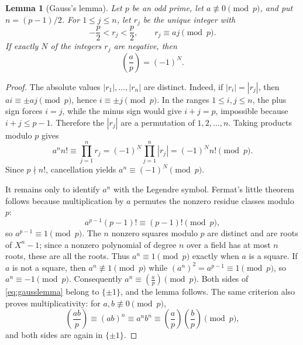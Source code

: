 \documentclass[11pt,a4paper]{amsart}
\numberwithin{equation}{section}
\newtheorem{lemma}[theorem]{Lemma}
\theoremstyle{definition}
\begin{document}
\begin{lemma}[Gauss's lemma]\label{lem:gauss}
Let $p$ be an odd prime, let $a\not\equiv0\pmod p$, and put
$n=(p-1)/2$.  For $1\le j\le n$, let $r_j$ be the unique integer with
\begin{equation*}
 -\frac p2<r_j<\frac p2,
 \qquad r_j\equiv aj\pmod p.
\end{equation*}
If exactly $N$ of the integers $r_j$ are negative, then
\begin{equation}
 \left(\frac ap\right)=(-1)^N.
 \label{eq:gausslemma}
\end{equation}
\end{lemma}

\begin{proof}
The absolute values $|r_1|,\ldots,|r_n|$ are distinct.  Indeed, if
$|r_i|=|r_j|$, then $ai\equiv\pm aj\pmod p$, hence
$i\equiv\pm j\pmod p$.  In the ranges $1\le i,j\le n$, the plus sign
forces $i=j$, while the minus sign would give $i+j=p$, impossible
because $i+j\le p-1$.  Therefore the $|r_j|$ are a permutation of
$1,2,\ldots,n$.  Taking products modulo $p$ gives
\begin{equation*}
 a^n n!
 \equiv\prod_{j=1}^n r_j
 =(-1)^N\prod_{j=1}^n|r_j|
 =(-1)^N n!\pmod p.
\end{equation*}
Since $p\nmid n!$, cancellation yields
$a^n\equiv(-1)^N\pmod p$.

It remains only to identify $a^n$ with the Legendre symbol.  Fermat's
little theorem follows because multiplication by $a$ permutes the
nonzero residue classes modulo $p$:
\begin{equation*}
 a^{p-1}(p-1)!\equiv(p-1)!\pmod p,
\end{equation*}
so $a^{p-1}\equiv1\pmod p$.  The $n$ nonzero squares modulo $p$ are
distinct and are roots of $X^n-1$; since a nonzero polynomial of
degree $n$ over a field has at most $n$ roots, these are all the roots.
Thus $a^n\equiv1\pmod p$ exactly when $a$ is a square.  If $a$ is not
a square, then $a^n\not\equiv1\pmod p$ while
$(a^n)^2=a^{p-1}\equiv1\pmod p$, so $a^n\equiv-1\pmod p$.
Consequently $a^n\equiv\left(\frac ap\right)\pmod p$.  Both sides of
\eqref{eq:gausslemma} belong to $\{\pm1\}$, and the lemma follows.
The same criterion also proves multiplicativity: for
$a,b\not\equiv0\pmod p$,
\begin{equation*}
 \left(\frac{ab}{p}\right)
 \equiv (ab)^n
 \equiv a^n b^n
 \equiv \left(\frac ap\right)\left(\frac bp\right)\pmod p,
\end{equation*}
and both sides are again in $\{\pm1\}$.
\end{proof}
\end{document}
